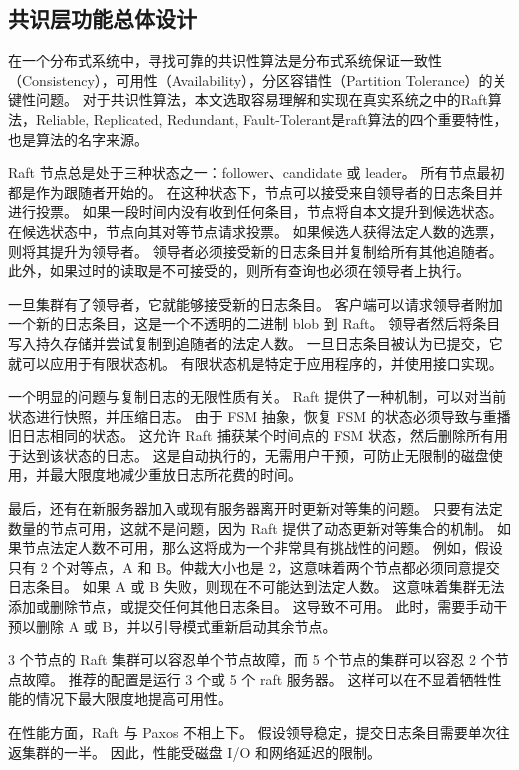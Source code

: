     \subsection{共识层功能总体设计}	
    在一个分布式系统中，寻找可靠的共识性算法是分布式系统保证一致性（Consistency），可用性（Availability），分区容错性（Partition Tolerance）的关键性问题。
    对于共识性算法，本文选取容易理解和实现在真实系统之中的Raft算法，Reliable, Replicated, Redundant, Fault-Tolerant是raft算法的四个重要特性，也是算法的名字来源。
    
    Raft 节点总是处于三种状态之一：follower、candidate 或 leader。 
    所有节点最初都是作为跟随者开始的。 在这种状态下，节点可以接受来自领导者的日志条目并进行投票。 
    如果一段时间内没有收到任何条目，节点将自本文提升到候选状态。 在候选状态中，节点向其对等节点请求投票。 
    如果候选人获得法定人数的选票，则将其提升为领导者。 领导者必须接受新的日志条目并复制给所有其他追随者。 
    此外，如果过时的读取是不可接受的，则所有查询也必须在领导者上执行。

    一旦集群有了领导者，它就能够接受新的日志条目。 
    客户端可以请求领导者附加一个新的日志条目，这是一个不透明的二进制 blob 到 Raft。 
    领导者然后将条目写入持久存储并尝试复制到追随者的法定人数。 
    一旦日志条目被认为已提交，它就可以应用于有限状态机。 
    有限状态机是特定于应用程序的，并使用接口实现。
    
    一个明显的问题与复制日志的无限性质有关。 
    Raft 提供了一种机制，可以对当前状态进行快照，并压缩日志。 
    由于 FSM 抽象，恢复 FSM 的状态必须导致与重播旧日志相同的状态。 
    这允许 Raft 捕获某个时间点的 FSM 状态，然后删除所有用于达到该状态的日志。 
    这是自动执行的，无需用户干预，可防止无限制的磁盘使用，并最大限度地减少重放日志所花费的时间。
    
    最后，还有在新服务器加入或现有服务器离开时更新对等集的问题。 
    只要有法定数量的节点可用，这就不是问题，因为 Raft 提供了动态更新对等集合的机制。 
    如果节点法定人数不可用，那么这将成为一个非常具有挑战性的问题。 
    例如，假设只有 2 个对等点，A 和 B。仲裁大小也是 2，这意味着两个节点都必须同意提交日志条目。 
    如果 A 或 B 失败，则现在不可能达到法定人数。 
    这意味着集群无法添加或删除节点，或提交任何其他日志条目。 
    这导致不可用。 此时，需要手动干预以删除 A 或 B，并以引导模式重新启动其余节点。
    
    3 个节点的 Raft 集群可以容忍单个节点故障，而 5 个节点的集群可以容忍 2 个节点故障。 
    推荐的配置是运行 3 个或 5 个 raft 服务器。 这样可以在不显着牺牲性能的情况下最大限度地提高可用性。
    
    在性能方面，Raft 与 Paxos 不相上下。 
    假设领导稳定，提交日志条目需要单次往返集群的一半。 
    因此，性能受磁盘 I/O 和网络延迟的限制。

